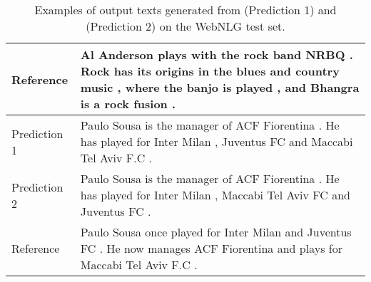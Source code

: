\documentclass[11pt]{article}
\begin{document}
\begin{table*}[]
\begin{tabular}{l|p{13cm}}
Reference     & Al Anderson plays with the rock band NRBQ . Rock has its origins in the blues and country music , where the banjo is played , and Bhangra is a rock fusion .                  \\ \midrule[2pt]
Prediction 1 & Paulo Sousa is the manager of ACF Fiorentina . He has played for Inter Milan , Juventus FC and Maccabi Tel Aviv F.C .                                                         \\ \hline
Prediction 2 & Paulo Sousa is the manager of ACF Fiorentina . He has played for Inter Milan , Maccabi Tel Aviv FC and Juventus FC .                                                          \\ \hline
Reference     & Paulo Sousa once played for Inter Milan and Juventus FC . He now manages ACF Fiorentina and plays for Maccabi Tel Aviv F.C .                                                  \\ \midrule[2pt]
\end{tabular}\caption{\label{tab:ExamplesWebNLG} Examples of output texts generated from  (Prediction 1) and  (Prediction 2) on the WebNLG test set. }
\end{table*}
\end{document}
